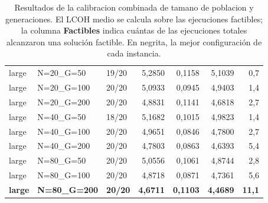 \begin{table}[H]
\begin{tabular}{lllrrrr}
        large & N=20\_G=50 & 19/20 & 5,2850 & 0,1158 & 5,1039 & 0,7 \\
        large & N=20\_G=100 & 20/20 & 5,0933 & 0,0945 & 4,9403 & 1,4 \\
        large & N=20\_G=200 & 20/20 & 4,8831 & 0,1141 & 4,6818 & 2,7 \\
        large & N=40\_G=50 & 18/20 & 5,1682 & 0,1015 & 4,9823 & 1,4 \\
        large & N=40\_G=100 & 20/20 & 4,9651 & 0,0846 & 4,7800 & 2,7 \\
        large & N=40\_G=200 & 20/20 & 4,7803 & 0,0863 & 4,6393 & 5,4 \\
        large & N=80\_G=50 & 20/20 & 5,0556 & 0,1061 & 4,8744 & 2,8 \\
        large & N=80\_G=100 & 20/20 & 4,8718 & 0,0871 & 4,7361 & 5,6 \\
        \textbf{large} & \textbf{N=80\_G=200} & \textbf{20/20} & \textbf{4,6711} & \textbf{0,1103} & \textbf{4,4689} & \textbf{11,1} \\
        \hline
    \end{tabular}
    \caption{Resultados de la calibracion combinada de tamano de poblacion y generaciones. El LCOH medio se calcula sobre las ejecuciones factibles; la columna \textbf{Factibles} indica cuántas de las ejecuciones totales alcanzaron una solución factible. En negrita, la mejor configuración de cada instancia.}
    \label{tab:calib_e06_ng}
\end{table}
